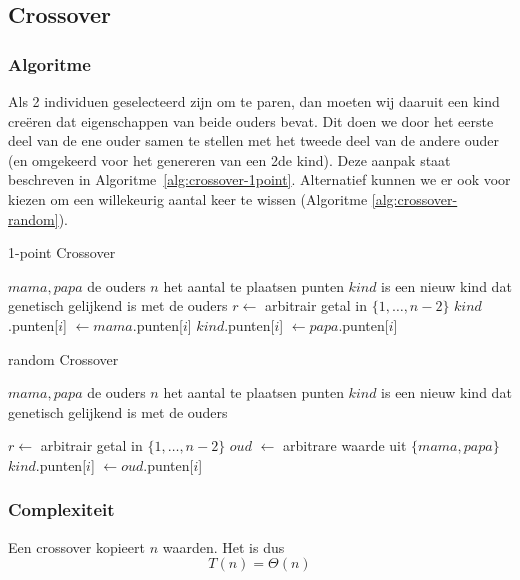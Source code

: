 %
\subsection{Crossover}
\subsubsection{Algoritme}
\label{sub:crossover}
Als 2 individuen geselecteerd zijn om te paren, dan moeten wij daaruit een kind creëren dat eigenschappen van beide ouders bevat. Dit doen we door het eerste deel van de ene ouder samen te stellen met het tweede deel van de andere ouder (en omgekeerd voor het genereren van een 2de kind). Deze aanpak staat beschreven in Algoritme~\ref{alg:crossover-1point}.
Alternatief kunnen we er ook voor kiezen om een willekeurig aantal keer te wissen (Algoritme \ref{alg:crossover-random}).
	\begin{algorithm}
	 	\caption{1-point Crossover}
		\begin{algorithmic}
		\Require \State $mama, papa$ de ouders \State $n$ het aantal te plaatsen punten
		\Ensure $kind$ is een nieuw kind dat genetisch gelijkend is met de ouders
		\State $r \gets$ arbitrair getal in $\lbrace 1, \dots , n-2\rbrace$
			\State $kind$.punten[$i$] $\gets mama$.punten[$i$]
		\EndFor
			\State $kind$.punten[$i$] $\gets papa$.punten[$i$]
		\EndFor
		\end{algorithmic}
		\label{alg:crossover-1point}
	\end{algorithm}		
	\begin{algorithm}
	 	\caption{random Crossover}
		\begin{algorithmic}
		\Require \State $mama, papa$ de ouders \State $n$ het aantal te plaatsen punten
		\Ensure $kind$ is een nieuw kind dat genetisch gelijkend is met de ouders
		
		\State $r \gets$ arbitrair getal in $\lbrace 1, \dots , n-2\rbrace$
		\For{i \textbf{from} 0 \textbf{to} $n-1$}
		\State $oud$ $\gets$ arbitrare waarde uit $\lbrace mama, papa \rbrace$
		\State $kind$.punten[$i$] $\gets oud$.punten[$i$]
			
		\EndFor

		\end{algorithmic}
		\label{alg:crossover-random}
	\end{algorithm}		



\subsubsection{Complexiteit}
\label{sub:alg_crossover_compl}
Een crossover kopieert $n$ waarden. Het is dus \[T(n)=\Theta(n)\]


